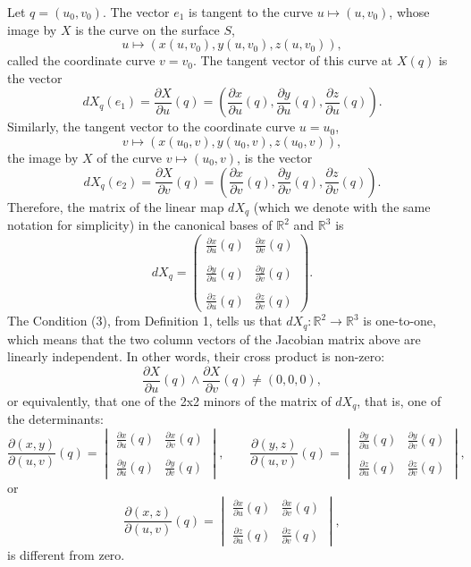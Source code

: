 \documentclass{amsart}
\theoremstyle{plain}
\numberwithin{equation}{section}
\begin{document}
Let $q = (u_0, v_0)$. The vector $e_1$ is tangent to the curve $u \mapsto (u, v_0)$, whose image by $X$ is the curve on the surface $ S $,
$$
u \mapsto (x(u, v_0), y(u, v_0), z(u, v_0)),
$$
called the coordinate curve $ v = v_0 $. The tangent vector of this curve at $X(q)$ is the vector
$$
dX_q(e_1) = \frac{\partial X}{\partial u}(q) =
\left( \frac{\partial x}{\partial u}(q), \frac{\partial y}{\partial u}(q), \frac{\partial z}{\partial u}(q) \right).
$$
Similarly, the tangent vector to the coordinate curve $u = u_0$,
$$
v \mapsto (x(u_0, v), y(u_0, v), z(u_0, v)),
$$
the image by $X$ of the curve $v \mapsto (u_0, v)$, is the vector
$$
dX_q(e_2) = \frac{\partial X}{\partial v}(q) =
\left( \frac{\partial x}{\partial v}(q), \frac{\partial y}{\partial v}(q), \frac{\partial z}{\partial v}(q) \right).
$$
Therefore, the matrix of the linear map $dX_q$ (which we denote with the same notation for simplicity) in the canonical bases of $\mathbb{R}^2$ and $ \mathbb{R}^3 $ is
$$
dX_q =
\begin{pmatrix}
	\frac{\partial x}{\partial u}(q) & \frac{\partial x}{\partial v}(q) \\ ~ \\
	\frac{\partial y}{\partial u}(q) & \frac{\partial y}{\partial v}(q) \\ ~ \\
	\frac{\partial z}{\partial u}(q) & \frac{\partial z}{\partial v}(q)
\end{pmatrix}.
$$
The Condition (3), from Definition 1, tells us that $dX_q: \mathbb{R}^2 \to \mathbb{R}^3$ is one-to-one, which means that the two column vectors of the Jacobian matrix above are linearly independent. In other words, their cross product is non-zero:
\begin{equation}\label{produto vetorial nao nulo}
	\frac{\partial X}{\partial u}(q) \wedge \frac{\partial X}{\partial v}(q) \neq (0,0,0),
\end{equation}
or equivalently, that one of the 2x2 minors of the matrix of $dX_q$, that is, one of the determinants:
$$
\frac{\partial(x, y)}{\partial(u, v)}(q) =
\begin{vmatrix}
	\frac{\partial x}{\partial u}(q) & \frac{\partial x}{\partial v}(q) \\ \\
	\frac{\partial y}{\partial u}(q) & \frac{\partial y}{\partial v}(q)
\end{vmatrix}, 
\quad \quad
\frac{\partial(y, z)}{\partial(u, v)}(q) =
\begin{vmatrix}
	\frac{\partial y}{\partial u}(q) & \frac{\partial y}{\partial v}(q) \\ \\
	\frac{\partial z}{\partial u}(q) & \frac{\partial z}{\partial v}(q)
\end{vmatrix},
$$
or
$$
\frac{\partial(x, z)}{\partial(u, v)}(q) =
\begin{vmatrix}
	\frac{\partial x}{\partial u}(q) & \frac{\partial x}{\partial v}(q) \\ \\
	\frac{\partial z}{\partial u}(q) & \frac{\partial z}{\partial v}(q)
\end{vmatrix},
$$
is different from zero.
\end{document}
